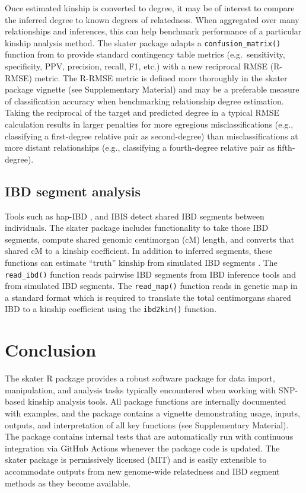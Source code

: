 \documentclass{bioinfo}
\begin{document}
Once estimated kinship is converted to degree, it may be of interest to
compare the inferred degree to known degrees of relatedness. When
aggregated over many relationships and inferences, this can help
benchmark performance of a particular kinship analysis method. The
skater package adapts a \texttt{confusion\_matrix()} function from
\citet{clark2021} to provide standard contingency table metrics
(e.g.~sensitivity, specificity, PPV, precision, recall, F1, etc.) with a
new reciprocal RMSE (R-RMSE) metric. The R-RMSE metric is defined more
thoroughly in the skater package vignette (see Supplementary Material)
and may be a preferable measure of classification accuracy when
benchmarking relationship degree estimation. Taking the reciprocal of
the target and predicted degree in a typical RMSE calculation results in
larger penalties for more egregious misclassifications (e.g.,
classifying a first-degree relative pair as second-degree) than
misclassifications at more distant relationships (e.g., classifying a
fourth-degree relative pair as fifth-degree).

\subsection{IBD segment analysis}

Tools such as hap-IBD \citep{zhou2020}, and IBIS \citep{seidman2020}
detect shared IBD segments between individuals. The skater package
includes functionality to take those IBD segments, compute shared
genomic centimorgan (cM) length, and converts that shared cM to a
kinship coefficient. In addition to inferred segments, these functions
can estimate ``truth'' kinship from simulated IBD segments
\citep{caballero2019}. The \texttt{read\_ibd()} function reads pairwise
IBD segments from IBD inference tools and from simulated IBD segments.
The \texttt{read\_map()} function reads in genetic map in a standard
format which is required to translate the total centimorgans shared IBD
to a kinship coefficient using the \texttt{ibd2kin()} function.

\section{Conclusion}

The skater R package provides a robust software package for data import,
manipulation, and analysis tasks typically encountered when working with
SNP-based kinship analysis tools. All package functions are internally
documented with examples, and the package contains a vignette
demonstrating usage, inputs, outputs, and interpretation of all key
functions (see Supplementary Material). The package contains internal
tests that are automatically run with continuous integration via GitHub
Actions whenever the package code is updated. The skater package is
permissively licensed (MIT) and is easily extensible to accommodate
outputs from new genome-wide relatedness and IBD segment methods as they
become available.
\end{document}

